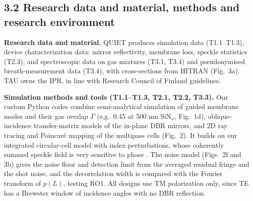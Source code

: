\documentclass[a4paper,12pt]{article}
\begin{document}
\subsection*{3.2 Research data and material, methods and research environment}


\textbf{Research data and material.} QUIET produces simulation data (T1.1--T1.3), device characterization data: mirror reflectivity, membrane loss, speckle statistics (T2.3), and spectroscopic data on gas mixtures (T3.1, T3.4) and pseudonymised breath-measurement data (T3.4), with cross-sections from HITRAN (Fig.~3a)\cite{Gordon2022}. TAU owns the IPR, in line with Research Council of Finland guidelines. %

\textbf{Simulation methods and tools (T1.1--T1.3, T2.1, T2.2, T3.3).} Our custom Python codes combine semi-analytical simulation of guided membrane modes and their gas overlap $\Gamma$ (e.g.~0.45 at 500 nm SiN$_x$, Fig.~1d), oblique-incidence transfer-matrix models of the in-plane DBR mirrors, and 2D ray tracing and Poincar\'e mapping of the multipass cells (Fig.~2). It builds on our integrated circular-cell model with index perturbations, whose coherently summed speckle field is very sensitive to phase \cite{Arola2026}. The noise model (Figs.~2f and 3b) gives the noise floor and detection limit from the averaged residual fringe and the shot noise, and the decorrelation width is compared with the Fourier transform of $p(L)$, testing RO1. All designs use TM polarization only, since TE has a Brewster window of incidence angles with no DBR reflection.
\end{document}
